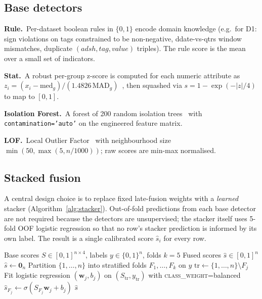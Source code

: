 \documentclass{ieeeaccess}
\begin{document}
\subsection{Base detectors}
\label{subsec:bases}
\textbf{Rule.}~Per-dataset boolean rules in $\{0,1\}$ encode domain knowledge (e.g.\ for D1: sign violations
on tags constrained to be non-negative, ddate-vs-qtrs window mismatches, duplicate $(adsh, tag, value)$
triples). The rule score is the mean over a small set of indicators.

\textbf{Stat.}~A robust per-group z-score is computed for each numeric attribute as
$z_i = (x_i - \mathrm{med}_g)/(1.4826\,\mathrm{MAD}_g)$~\cite{rousseeuw1993alternatives}, then squashed via
$s = 1 - \exp(-|z|/4)$ to map to $[0,1]$.

\textbf{Isolation Forest.}~A forest of 200 random isolation trees~\cite{liu2008isolation,liu2012isolation}
with \texttt{contamination='auto'} on the engineered feature matrix.

\textbf{LOF.}~Local Outlier Factor~\cite{breunig2000lof} with neighbourhood size
$\min(50, \max(5, n/1000))$; raw scores are min-max normalised.

\subsection{Stacked fusion}
A central design choice is to replace fixed late-fusion weights with a \emph{learned} stacker
(Algorithm~\ref{alg:stacker}). Out-of-fold predictions from each base detector are not required because the
detectors are unsupervised; the stacker itself uses 5-fold OOF logistic regression so that no row's stacker
prediction is informed by its own label. The result is a single calibrated score
$\hat{s}_i$ for every row.

\begin{algorithm}[!htbp]
\caption{Stacked Hybrid Anomaly Score}
\label{alg:stacker}
\begin{algorithmic}[1]
\Require Base scores $S \in [0,1]^{n\times 4}$, labels $y\in\{0,1\}^n$, folds $k=5$
\Ensure Fused scores $\hat{s}\in[0,1]^{n}$
\State $\hat{s} \gets \mathbf{0}_n$
\State Partition $\{1,\ldots,n\}$ into stratified folds $F_1,\ldots,F_k$ on $y$
   \State $\mathrm{tr} \gets \{1,\ldots,n\}\setminus F_j$
   \State Fit logistic regression $(\mathbf{w}_j,b_j)$ on $(S_{\mathrm{tr}}, y_{\mathrm{tr}})$ with
          \textsc{class\_weight}=balanced
   \State $\hat{s}_{F_j} \gets \sigma(S_{F_j}\mathbf{w}_j + b_j)$
\EndFor
\State \Return $\hat{s}$
\end{algorithmic}
\end{algorithm}
\end{document}
